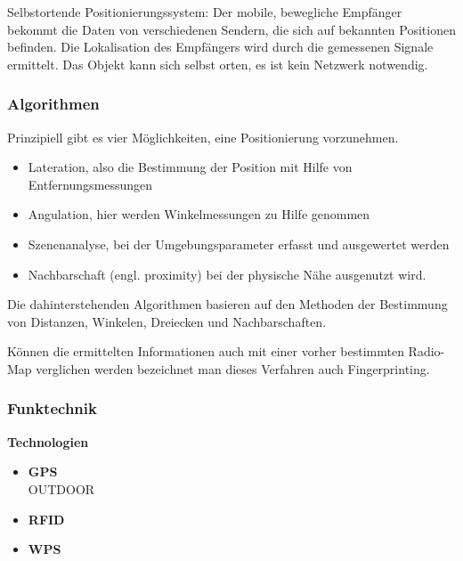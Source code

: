 \begin{itemize}
    Selbstortende Positionierungssystem: Der mobile, bewegliche Empfänger bekommt die Daten von verschiedenen Sendern, die sich auf bekannten Positionen befinden.
    Die Lokalisation des Empfängers wird durch die gemessenen Signale ermittelt. Das Objekt kann sich selbst orten, es ist kein Netzwerk notwendig.



    \subsubsection{Algorithmen}

    Prinzipiell gibt es vier Möglichkeiten, eine Positionierung vorzunehmen.
    \begin{itemize}
      \item Lateration, also die Bestimmung der Position mit Hilfe von Entfernungsmessungen
      \item Angulation, hier werden Winkelmessungen zu Hilfe genommen
      \item Szenenanalyse, bei der Umgebungsparameter erfasst und ausgewertet werden
      \item Nachbarschaft (engl. proximity) bei der physische Nähe ausgenutzt wird.
    \end{itemize}

    Die dahinterstehenden Algorithmen basieren auf den Methoden der Bestimmung von Distanzen, Winkelen, Dreiecken und Nachbarschaften.

    Können die ermittelten Informationen auch mit einer vorher bestimmten Radio-Map verglichen werden bezeichnet man dieses Verfahren auch Fingerprinting.



    \subsubsection{Funktechnik}


    \textbf{Technologien}\\
    \begin{itemize}
        \item \textbf{GPS}\\
        OUTDOOR
        \item \textbf{RFID}\\
        \item \textbf{WPS}\\
      \end{itemize}


\end{itemize}
